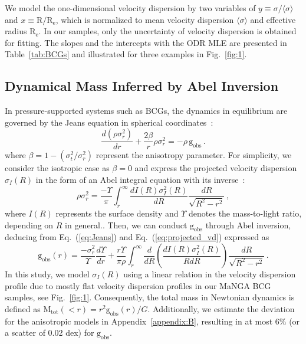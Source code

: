 \documentclass[a4paper, two-column, twocolappendix]{aa}
\newcommand{\percent}{\ensuremath{\%}}
\newcommand{\Mtot}{\mathrm{M}_\mathrm{tot}}
\newcommand{\gobs}{\mathrm{g}_\mathrm{obs}}
\begin{document}
We model the one-dimensional velocity dispersion by two variables of $y\equiv\sigma/\langle\sigma\rangle$ and $x\equiv\mathrm{R}/\mathrm{R_{e}}$, which is normalized to mean velocity dispersion $\langle\sigma\rangle$ and effective radius $\mathrm{R_{e}}$.
In our samples, only the uncertainty of velocity dispersion is obtained for fitting.
The slopes and the intercepts with the ODR MLE are presented in Table~\ref{tab:BCGs} and 
 illustrated for three examples in Fig.~\ref{fig:1}. 

    \subsection{Dynamical Mass Inferred by Abel Inversion}
In pressure-supported systems such as BCGs, 
 the dynamics in equilibrium are governed by the Jeans equation in spherical coordinates~\citep{BM82, BT08}:
\begin{equation}\label{eq:Jeans}
    \frac{d(\rho\sigma^2_{r})}{dr}+\frac{2\beta}{r}\rho\sigma^2_{r}=-\rho\,\gobs\,.
\end{equation}
where $\beta=1-(\sigma^2_{t}/\sigma^2_{r})$ represent the anisotropy parameter.
For simplicity, we consider the isotropic case as $\beta=0$ and express the projected velocity dispersion $\sigma_{I}(R)$ in the form of an Abel integral equation with its inverse~\citep{BM82, Mamon05, BT08}:
\begin{equation}\label{eq:projected_vd}
    \rho\sigma^2_{r}=\frac{-\Upsilon}{\pi}\int^{\infty}_{r}\frac{dI(R)\sigma^2_{I}(R)}{dR}\frac{dR}{\sqrt{R^2-r^2}}\,,
\end{equation}
where $I(R)$ represents the surface density and $\Upsilon$ denotes the mass-to-light ratio, depending on $R$ in general..
Then, we can conduct $\gobs$ through Abel inversion, deducing from Eq.~(\ref{eq:Jeans}) and Eq.~(\ref{eq:projected_vd}) expressed as~\citep{BM82, Mamon05, BT08}
\begin{equation}\label{eq:Abel}
   \gobs(r) = \frac{-\sigma^2_{r}}{\Upsilon}\frac{d\Upsilon}{dr} + \frac{r\Upsilon}{\pi\rho}\int^{\infty}_{r}\frac{d}{dR}\left(\frac{dI(R)\sigma^2_{I}(R)}{RdR}\right)\frac{dR}{\sqrt{R^2-r^2}}\,.
\end{equation} 
In this study, we model $\sigma_{I}(R)$ using a linear relation in the velocity dispersion profile due to mostly flat velocity dispersion profiles in our MaNGA BCG samples, see Fig.~\ref{fig:1}.
Consequently, the total mass in Newtonian dynamics is defined as $\Mtot(<r)=r^2\gobs(r)/G$. 
Additionally, we estimate the deviation for the anisotropic models in Appendix~\ref{appendix:B}, resulting in at most 6$\percent$ (or a scatter of 0.02 dex) for $\gobs$.
\end{document}
